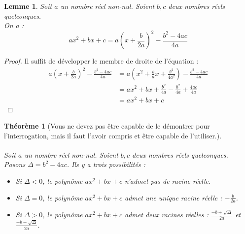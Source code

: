 \documentclass[a4paper,13pt]{scrreprt}
\theoremstyle{plain}
\newtheorem{thé}[subsection]{Théorème}
\newtheorem{lem}[subsection]{Lemme}
\theoremstyle{definition}
\begin{document}
\begin{lem} \label{lemfacto}
	Soit $a$ un nombre réel non-nul. Soient $b,c$ deux nombres réels quelconques. \\
	On a : $$ax^2+bx+c=a\left(x+\frac{b}{2a}\right)^2 - \frac{b^2 - 4ac}{4a}$$
\end{lem}
\begin{proof}
	Il suffit de développer le membre de droite de l'équation :
	\begin{align*}
	a\left(x+\frac{b}{2a}\right)^2 - \frac{b^2 - 4ac}{4a} &= a\left(x^2 + \frac{b}{a}x + \frac{b^2}{4a^2}\right)- \frac{b^2 - 4ac}{4a} \\
	&= ax^2 + bx + \frac{b^2}{4a} - \frac{b^2}{4a} + \frac{4ac}{4a}\\
	&= ax^2 + bx + c
	\end{align*}
\end{proof}
\begin{thé} [Vous ne devez pas être capable de le démontrer pour l'interrogation, mais il faut l'avoir compris et être capable de l'utiliser.] \label{thépara}
		~~\\
		~~\\
		Soit $a$ un nombre réel non-nul. Soient $b,c$ deux nombres réels quelconques. \\
		Posons $\Delta = b^2 -4ac$. Ils y a trois possibilités :
		\begin{itemize}
			\item [$\bullet$] Si $\Delta < 0$, le polynôme $ax^2 + bx +c$ n'admet pas de racine réelle.
			\item [$\bullet$] Si $\Delta = 0$, le polynôme $ax^2 + bx +c$ admet une unique racine réelle : $-\frac{b}{2a}$.
			\item [$\bullet$] Si $\Delta  > 0$, le polynôme $ax^2 + bx +c$ admet deux racines réelles : $\frac{-b + \sqrt{\Delta}}{2a}$ et $\frac{-b - \sqrt{\Delta}}{2a}$.
		\end{itemize}
\end{thé}
\end{document}
